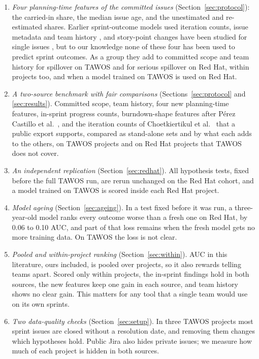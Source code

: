 \begin{enumerate}
\item \emph{Four planning-time features of the committed issues} (Section~\ref{sec:protocol}): the carried-in share, the median issue age, and the unestimated and re-estimated shares. Earlier sprint-outcome models used iteration counts, issue metadata and team history \cite{choet2018,kula2021}, and story-point changes have been studied for single issues \cite{pasuksmit2022}, but to our knowledge none of these four has been used to predict sprint outcomes. As a group they add to committed scope and team history for spillover on TAWOS and for serious spillover on Red Hat, within projects too, and when a model trained on TAWOS is used on Red Hat.
\item \emph{A two-source benchmark with fair comparisons} (Sections~\ref{sec:protocol} and \ref{sec:results}). Committed scope, team history, four new planning-time features, in-sprint progress counts, burndown-shape features after P\'erez Castillo et al.\ \cite{perez2024}, and the iteration counts of Choetkiertikul et al.\ \cite{choet2018} that a public export supports, compared as stand-alone sets and by what each adds to the others, on \NProj{} TAWOS projects and on \RHProj{} Red Hat projects that TAWOS does not cover.
\item \emph{An independent replication} (Section~\ref{sec:redhat}). All \NHyp{} hypothesis tests, fixed before the full TAWOS run, are rerun unchanged on the Red Hat cohort, and a model trained on TAWOS is scored inside each Red Hat project.
\item \emph{Model ageing} (Section~\ref{sec:ageing}). In a test fixed before it was run, a three-year-old model ranks every outcome worse than a fresh one on Red Hat, by 0.06 to 0.10 AUC, and part of that loss remains when the fresh model gets no more training data. On TAWOS the loss is not clear.
\item \emph{Pooled and within-project ranking} (Section~\ref{sec:within}). AUC in this literature, ours included, is pooled over projects, so it also rewards telling teams apart. Scored only within projects, the in-sprint findings hold in both sources, the new features keep one gain in each source, and team history shows no clear gain. This matters for any tool that a single team would use on its own sprints.
\item \emph{Two data-quality checks} (Section~\ref{sec:setup}). In three TAWOS projects most sprint issues are closed without a resolution date, and removing them changes which hypotheses hold. Public Jira also hides private issues; we measure how much of each project is hidden in both sources.

\end{enumerate}
